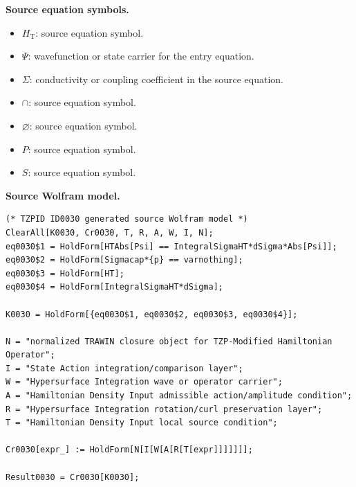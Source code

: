 \begin{minipage}[t]{0.49\linewidth}
\begingroup
\small
\raggedright
\textbf{Source equation symbols.}\par
\begin{itemize}[leftmargin=1.35em,itemsep=1pt,topsep=1pt,parsep=0pt]
    \item $H_{\mathrm{T}}$: source equation symbol.
    \item $\Psi$: wavefunction or state carrier for the entry equation.
    \item $\Sigma$: conductivity or coupling coefficient in the source equation.
    \item $\cap$: source equation symbol.
    \item $\varnothing$: source equation symbol.
    \item $P$: source equation symbol.
    \item $S$: source equation symbol.
\end{itemize}
\endgroup
\end{minipage}\hfill
\begin{minipage}[t]{0.47\linewidth}
\begingroup
\scriptsize
\raggedright
\textbf{Source Wolfram model.}\par
\begin{Verbatim}[fontsize=\tiny,breaklines=true,breakanywhere=true]
(* TZPID ID0030 generated source Wolfram model *)
ClearAll[K0030, Cr0030, T, R, A, W, I, N];
eq0030$1 = HoldForm[HTAbs[Psi] == IntegralSigmaHT*dSigma*Abs[Psi]];
eq0030$2 = HoldForm[Sigmacap*{p} == varnothing];
eq0030$3 = HoldForm[HT];
eq0030$4 = HoldForm[IntegralSigmaHT*dSigma];

K0030 = HoldForm[{eq0030$1, eq0030$2, eq0030$3, eq0030$4}];

N = "normalized TRAWIN closure object for TZP-Modified Hamiltonian Operator";
I = "State Action integration/comparison layer";
W = "Hypersurface Integration wave or operator carrier";
A = "Hamiltonian Density Input admissible action/amplitude condition";
R = "Hypersurface Integration rotation/curl preservation layer";
T = "Hamiltonian Density Input local source condition";

Cr0030[expr_] := HoldForm[N[I[W[A[R[T[expr]]]]]]];

Result0030 = Cr0030[K0030];
\end{Verbatim}
\endgroup
\end{minipage}

